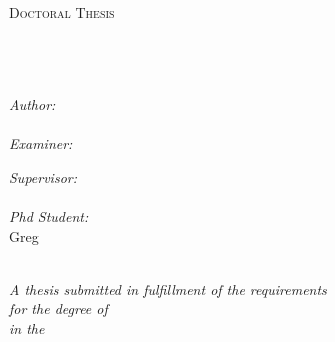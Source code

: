 \documentclass[
11pt, %
english, %
singlespacing, %
headsepline, %
]{MastersDoctoralThesis} %
\author{John \textsc{Smith}} %
\begin{document}
\frontmatter %

\pagestyle{plain} %


\begin{titlepage}
\begin{center}

\textsc{\LARGE \univname}\\[1.5cm] %
\textsc{\Large Doctoral Thesis}\\[0.5cm] %

\HRule \\[0.4cm] %
{\huge \bfseries \ttitle}\\[0.4cm] %
\HRule \\[1.5cm] %
 
\begin{minipage}{0.4\textwidth}
\begin{flushleft} \large
\emph{Author:}\\
\href{http://www.johnsmith.com}{\authorname} \\ %
\emph{Examiner:}\\
\examname
\end{flushleft}
\end{minipage}
\begin{minipage}{0.4\textwidth}
\begin{flushright} \large
\emph{Supervisor:} \\
\href{http://www.jamessmith.com}{\supname}\\ %
\emph{Phd Student:}\\
Greg 
\end{flushright}
\end{minipage}\\[3cm]
 
\large \textit{A thesis submitted in fulfillment of the requirements\\ for the degree of \degreename}\\[0.3cm] %
\textit{in the}\\[0.4cm]
\groupname\\\deptname\\[1cm] %




\end{center}
\end{titlepage}
\end{document}
